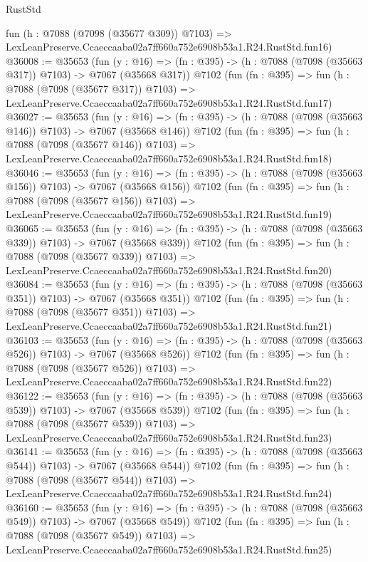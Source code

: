 \begin{lexlean}{RustStd}
\begin{coremodule}
    fun (h : @7088 (@7098 (@35677 @309)) @7103) =>
    LexLeanPreserve.Ccaeccaaba02a7ff660a752e6908b53a1.R24.RustStd.fun16)
@36008 := @35653
    (fun (y : @16) => (fn : @395) -> (h : @7088 (@7098 (@35663 @317)) @7103) -> @7067 (@35668 @317))
    @7102
    (fun (fn : @395) =>
    fun (h : @7088 (@7098 (@35677 @317)) @7103) =>
    LexLeanPreserve.Ccaeccaaba02a7ff660a752e6908b53a1.R24.RustStd.fun17)
@36027 := @35653
    (fun (y : @16) => (fn : @395) -> (h : @7088 (@7098 (@35663 @146)) @7103) -> @7067 (@35668 @146))
    @7102
    (fun (fn : @395) =>
    fun (h : @7088 (@7098 (@35677 @146)) @7103) =>
    LexLeanPreserve.Ccaeccaaba02a7ff660a752e6908b53a1.R24.RustStd.fun18)
@36046 := @35653
    (fun (y : @16) => (fn : @395) -> (h : @7088 (@7098 (@35663 @156)) @7103) -> @7067 (@35668 @156))
    @7102
    (fun (fn : @395) =>
    fun (h : @7088 (@7098 (@35677 @156)) @7103) =>
    LexLeanPreserve.Ccaeccaaba02a7ff660a752e6908b53a1.R24.RustStd.fun19)
@36065 := @35653
    (fun (y : @16) => (fn : @395) -> (h : @7088 (@7098 (@35663 @339)) @7103) -> @7067 (@35668 @339))
    @7102
    (fun (fn : @395) =>
    fun (h : @7088 (@7098 (@35677 @339)) @7103) =>
    LexLeanPreserve.Ccaeccaaba02a7ff660a752e6908b53a1.R24.RustStd.fun20)
@36084 := @35653
    (fun (y : @16) => (fn : @395) -> (h : @7088 (@7098 (@35663 @351)) @7103) -> @7067 (@35668 @351))
    @7102
    (fun (fn : @395) =>
    fun (h : @7088 (@7098 (@35677 @351)) @7103) =>
    LexLeanPreserve.Ccaeccaaba02a7ff660a752e6908b53a1.R24.RustStd.fun21)
@36103 := @35653
    (fun (y : @16) => (fn : @395) -> (h : @7088 (@7098 (@35663 @526)) @7103) -> @7067 (@35668 @526))
    @7102
    (fun (fn : @395) =>
    fun (h : @7088 (@7098 (@35677 @526)) @7103) =>
    LexLeanPreserve.Ccaeccaaba02a7ff660a752e6908b53a1.R24.RustStd.fun22)
@36122 := @35653
    (fun (y : @16) => (fn : @395) -> (h : @7088 (@7098 (@35663 @539)) @7103) -> @7067 (@35668 @539))
    @7102
    (fun (fn : @395) =>
    fun (h : @7088 (@7098 (@35677 @539)) @7103) =>
    LexLeanPreserve.Ccaeccaaba02a7ff660a752e6908b53a1.R24.RustStd.fun23)
@36141 := @35653
    (fun (y : @16) => (fn : @395) -> (h : @7088 (@7098 (@35663 @544)) @7103) -> @7067 (@35668 @544))
    @7102
    (fun (fn : @395) =>
    fun (h : @7088 (@7098 (@35677 @544)) @7103) =>
    LexLeanPreserve.Ccaeccaaba02a7ff660a752e6908b53a1.R24.RustStd.fun24)
@36160 := @35653
    (fun (y : @16) => (fn : @395) -> (h : @7088 (@7098 (@35663 @549)) @7103) -> @7067 (@35668 @549))
    @7102
    (fun (fn : @395) =>
    fun (h : @7088 (@7098 (@35677 @549)) @7103) =>
    LexLeanPreserve.Ccaeccaaba02a7ff660a752e6908b53a1.R24.RustStd.fun25)

\end{coremodule}
\end{lexlean}

